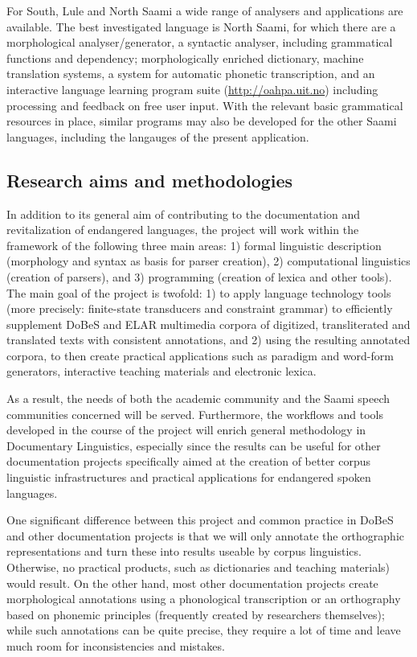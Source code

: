 \documentclass[a4paper,12pt]{article}
\begin{document}
For South, Lule and North Saami a wide range of analysers and applications are available. The best investigated language is North Saami, for which there are a morphological analyser/generator, a syntactic analyser, including grammatical functions and dependency; morphologically enriched dictionary, machine translation systems, a system for automatic phonetic transcription, and an interactive language learning program suite (\url{http://oahpa.uit.no}) including processing and feedback on free user input. With the relevant basic grammatical resources in place, similar programs may also be developed for the other Saami languages, including the langauges of the present application.

\subsection{Research aims and methodologies}%

In addition to its general aim of contributing to the documentation and revitalization of endangered languages, the project will work within the framework of the following three main areas: 1) formal linguistic description (morphology and syntax as basis for parser creation), 2) computational linguistics (creation of parsers), and 3) programming (creation of lexica and other tools). The main goal of the project is twofold: 1) to apply language technology tools (more precisely: finite-state transducers and constraint grammar) to efficiently supplement DoBeS and ELAR multimedia corpora of digitized, transliterated and translated texts with consistent annotations, and 2) using the resulting annotated corpora, to then create practical applications such as paradigm and word-form generators, interactive teaching materials and electronic lexica. 

As a result, the needs of both the academic community and the Saami speech communities concerned will be served. Furthermore, the workflows and tools developed in the course of the project will enrich general methodology in Documentary Linguistics, especially since the results can be useful for other documentation projects specifically aimed at the creation of better corpus linguistic infrastructures and practical applications for endangered spoken languages.

One significant difference between this project and common practice in DoBeS and other documentation projects is that we will only annotate the orthographic representations and turn these into results useable by corpus linguistics. Otherwise, no practical products, such as dictionaries and teaching materials) would result. On the other hand, most other documentation projects create morphological annotations using a phonological transcription or an orthography based on phonemic principles (frequently created by researchers themselves); while such annotations can be quite precise, they require a lot of time and leave much room for inconsistencies and mistakes.
\end{document}
